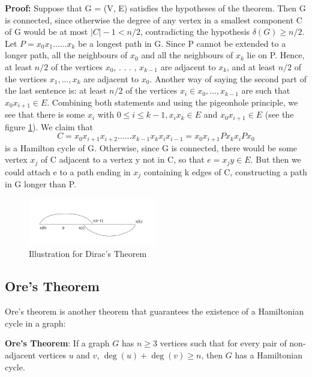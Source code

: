 \documentclass[14pt, times, a4paper]{extarticle}
\begin{document}
\textbf{Proof:} Suppose that G = (V, E) satisfies the hypotheses of the theorem. Then G is connected, since otherwise the degree of any vertex in a smallest component C of G would be
at most $|C| - 1 < n/2$, contradicting the hypothesis $\delta(G) \geq n/2$.
Let $P = x_0x_1$......$x_k$ be a longest path in G. Since P cannot be extended to a longer path, all the neighbours of $x_0$ and all the neighbours of $x_k$ lie on P. Hence, at least $n/2$ of
the vertices $x_0$, . . . , $x_{k-1}$ are adjacent to $x_k$, and at least $n/2$ of the vertices $x_1, . . . , x_k$ are
adjacent to $x_0$. Another way of saying the second part of the last sentence is: at least $n/2$ of the vertices $x_i \in {x_0, . . . , x_{k-1}}$ are such that $x_0x_{i+1} \in E$. Combining both statements and
using the pigeonhole principle, we see that there is some $x_i$ with $0 \leq i \leq k - 1, x_ix_k \in E$
and $x_0x_{i+1} \in E$ (see the figure \ref{fig:dirac}).
\hspace*{1cm} We claim that
\begin{equation}
    C=x_0x_{i+1}x_{i+2}......x_{k-1}x_{k}x_ix_{i-1}=x_0x_{i+1}Px_kx_iPx_0
\end{equation}
is a Hamilton cycle of G. Otherwise, since G is connected, there would be some vertex $x_j$
of C adjacent to a vertex y not in C, so that $e = x_jy \in E.$ But then we could attach e to
a path ending in $x_j$ containing k edges of C, constructing a path in G longer than P.
\begin{figure}[h]
    \centering
    \includegraphics[width=0.5\textwidth]{images/imon_graph.jpeg}
    \caption{Illustration for Dirac's Theorem}
    \label{fig:dirac}
\end{figure}
\subsection{Ore's Theorem}

Ore's theorem is another theorem that guarantees the existence of a Hamiltonian cycle in a graph:

\textbf{Ore's Theorem}: If a graph $G$ has $n \geq 3$ vertices such that for every pair of non-adjacent vertices $u$ and $v$, $\deg(u) + \deg(v) \geq n$, then $G$ has a Hamiltonian cycle.
\end{document}
